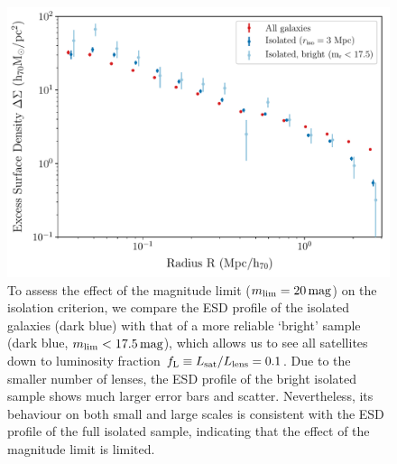 \documentclass[usenatbib]{mnras}
\newcommand{\magn}{\, {\rm mag} }
\newcommand{\un}[1]{_{\rm #1}}
\begin{document}
\begin{figure}
	\includegraphics[width=1.0\columnwidth]{Figures/ESD_KiDS_isotest.pdf}
	\caption{To assess the effect of the magnitude limit ($m\un{lim}=20 \magn$) on the isolation criterion, we compare the ESD profile of the isolated galaxies (dark blue) with that of a more reliable `bright' sample (dark blue, $m\un{lim}<17.5 \magn$), which allows us to see all satellites down to luminosity fraction $f\un{L} \equiv L\un{sat}/L\un{lens}=0.1$. Due to the smaller number of lenses, the ESD profile of the bright isolated sample shows much larger error bars and scatter. Nevertheless, its behaviour on both small and large scales is consistent with the ESD profile of the full isolated sample, indicating that the effect of the magnitude limit is limited.}
	\label{fig:isolation_test_ESD}
\end{figure}
\end{document}

